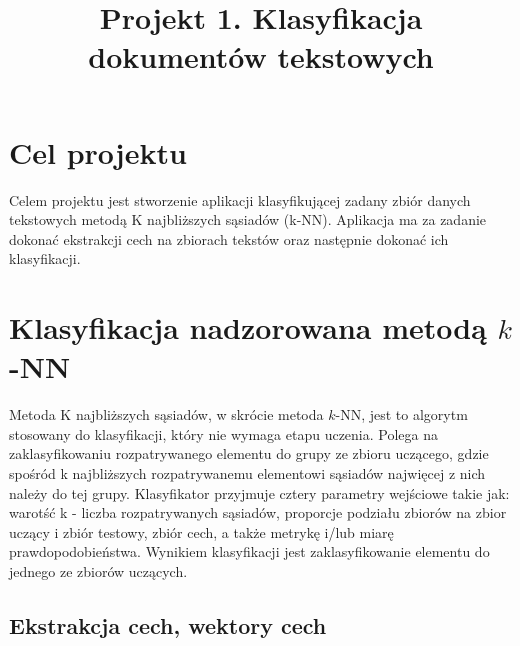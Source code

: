 \documentclass{classrep}
\author{
  \studentinfo{Julia Szymańska}{224441} \and
  \studentinfo{Przemysław Zdrzalik}{224466} }
\title{Projekt 1. Klasyfikacja dokumentów tekstowych}
\begin{document}
\maketitle


\section{Cel projektu}

Celem projektu jest stworzenie aplikacji klasyfikującej zadany zbiór danych tekstowych metodą K najbliższych sąsiadów (k-NN). Aplikacja ma za zadanie dokonać ekstrakcji cech na zbiorach tekstów\cite{dane} oraz następnie dokonać ich klasyfikacji.\\


\section{Klasyfikacja nadzorowana metodą $k$-NN}

Metoda K najbliższych sąsiadów, w skrócie metoda $k$-NN\cite{dane}, jest to algorytm stosowany do klasyfikacji, który nie wymaga etapu uczenia. 
Polega na zaklasyfikowaniu rozpatrywanego elementu do grupy ze zbioru uczącego, gdzie spośród k najbliższych rozpatrywanemu elementowi sąsiadów najwięcej z nich należy do tej grupy. Klasyfikator przyjmuje cztery parametry wejściowe takie jak: warotść k - liczba rozpatrywanych sąsiadów, proporcje podziału zbiorów na zbior uczący i zbiór testowy, zbiór cech, a także metrykę i/lub miarę prawdopodobieństwa. Wynikiem klasyfikacji jest zaklasyfikowanie elementu do jednego ze zbiorów uczących. 


\subsection{Ekstrakcja cech, wektory cech}
\end{document}
